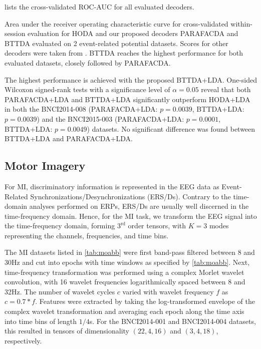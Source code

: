 \documentclass[10pt]{iopart}
\begin{document}
 lists the cross-validated ROC-AUC for all evaluated
decoders.
\begin{table}[t]
	\footnotesize
	
  \caption[Within-session classification score for 2 event-related potential
  datasets.]{Area under the receiver operating characteristic curve for
		cross-validated within-session evaluation for HODA and our proposed decoders
		PARAFACDA and BTTDA evaluated on 2 event-related potential datasets.
    Scores for other decoders were taken from \cite{Chevallier2024}.
		BTTDA reaches the highest performance for both evaluated datasets, closely
		followed by PARAFACDA.
	}
	\label{tab:erp-score}
\end{table}
The highest performance is achieved with the proposed BTTDA+LDA.
One-sided Wilcoxon signed-rank tests with a significance level of $\alpha=0.05$
reveal that both PARAFACDA+LDA and BTTDA+LDA significantly outperform
HODA+LDA in both the BNCI2014-008 (PARAFACDA+LDA: $p=0.0039$, BTTDA+LDA:
$p=0.0039$) and the BNCI2015-003 (PARAFACDA+LDA: $p=0.0001$, BTTDA+LDA:
$p=0.0049$) datasets.
No significant difference was found between BTTDA+LDA and PARAFACDA+LDA.


\subsection{Motor Imagery}
For MI, discriminatory information is represented in the EEG data as
Event-Related Synchronizations/Desynchronizations (ERS/Ds).
Contrary to the time-domain analyses performed on ERPs, ERS/Ds are usually well
discerned in the time-frequency domain.
Hence, for the MI task, we transform the EEG signal into the
time-frequency domain, forming $3^\text{rd}$ order tensors, with $K=3$ modes
representing the channels, frequencies, and time bins.

The MI datasets listed in \cref{tab:moabb} were first band-pass filtered
between 8 and 30Hz and cut into
epochs with time windows as specified by \cref{tab:moabb}.
Next, time-frequency transformation was performed using a complex Morlet wavelet
convolution, with 16 wavelet frequencies logarithmically spaced between 8 and
32Hz.
The number of wavelet cycles $c$ varied with wavelet frequency $f$ as
$c=0.7*f$.
Features were extracted by taking the log-transformed envelope of the complex
wavelet transformation and averaging each epoch along the time axis into time bins of
length $1/4$s.
For the BNCI2014-001 and BNCI2014-004 datasets, this resulted in tensors of dimensionality
$(22, 4, 16)$ and $(3, 4, 18)$, respectively.
\end{document}
